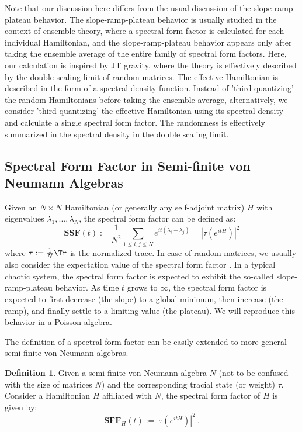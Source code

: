 \documentclass[a4paper,11pt]{article}
\theoremstyle{definition}
\newtheorem{definition}{Definition}[section]
\numberwithin{equation}{section}
\newcommand{\mN}{\mathcal{N}}
\begin{document}
Note that our discussion here differs from the usual discussion of the slope-ramp-plateau behavior. The slope-ramp-plateau behavior is usually studied in the context of ensemble theory, where a spectral form factor is calculated for each individual Hamiltonian, and the slope-ramp-plateau behavior appears only after taking the ensemble average of the entire family of spectral form factors. Here, our calculation is inspired by JT gravity, where the theory is effectively described by the double scaling limit of random matrices. The effective Hamiltonian is described in the form of a spectral density function. Instead of 'third quantizing' the random Hamiltonians before taking the ensemble average, alternatively, we consider 'third quantizing' the effective Hamiltonian using its spectral density and calculate a single spectral form factor. The randomness is effectively summarized in the spectral density in the double scaling limit.

\subsection{Spectral Form Factor in Semi-finite von Neumann Algebras}\label{subsubsection:spectralformfactorvna}
Given an $N\times N$ Hamiltonian (or generally any self-adjoint matrix) $H$ with eigenvalues $\lambda_1,...,\lambda_N$, the spectral form factor can be defined as\cite{sff-rm}:
\begin{equation}
    \textbf{SSF}(t) := \frac{1}{N^2}\sum_{1\leq i,j\leq N}e^{it(\lambda_i - \lambda_j)} = |\tau(e^{itH})|^2
\end{equation}
where $\tau := \frac{1}{N}\Tr$ is the normalized trace. In case of random matrices, we usually also consider the expectation value of the spectral form factor \cite{sff-rm}. In a typical chaotic system, the spectral form factor is expected to exhibit the so-called slope-ramp-plateau behavior. As time $t$ grows to $\infty$, the spectral form factor is expected to first decrease (the slope) to a global minimum, then increase (the ramp), and finally settle to a limiting value (the plateau). We will reproduce this behavior in a Poisson algebra.

The definition of a spectral form factor can be easily extended to more general semi-finite von Neumann algebras.
\begin{definition}
    Given a semi-finite von Neumann algebra $N$ (not to be confused with the size of matrices $N$) and the corresponding tracial state (or weight) $\tau$. Consider a Hamiltonian $H$ affiliated with $N$, the spectral form factor of $H$ is given by:
    \begin{equation}
        \textbf{SFF}_H(t) := |\tau(e^{itH})|^2\ .
    \end{equation}
\end{definition}
\end{document}
